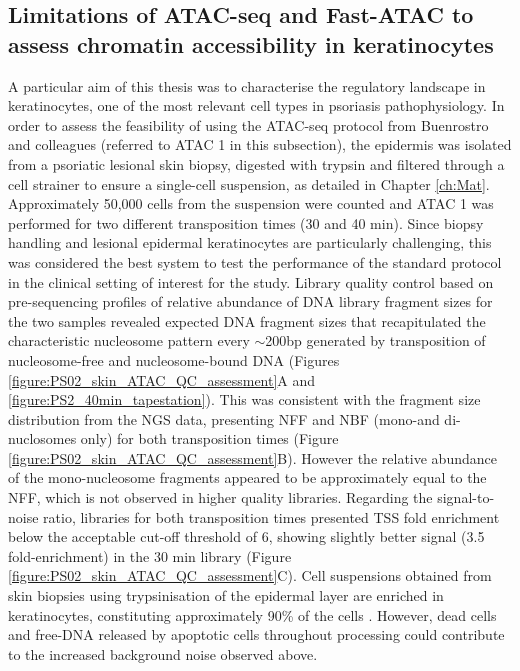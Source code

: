 \begin{figure}[htbp]
\label{figure:ATAC_vs_FAST_ATAC}
\end{figure} 



\subsection{Limitations of ATAC-seq and Fast-ATAC to assess chromatin accessibility in keratinocytes}
A particular aim of this thesis was to characterise the regulatory landscape in keratinocytes, one of the most relevant cell types in psoriasis pathophysiology. In order to assess the feasibility of using the ATAC-seq protocol from Buenrostro and colleagues \parencite{Buenrostro2013} (referred to ATAC 1 in this subsection), the epidermis was isolated from a psoriatic lesional skin biopsy, digested with trypsin and filtered through a cell strainer to ensure a single-cell suspension, as detailed in Chapter \ref{ch:Mat}. Approximately 50,000 cells from the suspension were counted and ATAC 1 was performed for two different transposition times (30 and 40 min). Since biopsy handling and lesional epidermal keratinocytes are particularly challenging, this was considered the best system to test the performance of the standard protocol in the clinical setting of interest for the study. Library quality control based on pre-sequencing profiles of relative abundance of DNA library fragment sizes for the two samples revealed expected DNA fragment sizes that recapitulated the characteristic nucleosome pattern every $\sim$200bp generated by transposition of nucleosome-free and nucleosome-bound DNA (Figures \ref{figure:PS02_skin_ATAC_QC_assessment}A and \ref{figure:PS2_40min_tapestation}). This was consistent with the fragment size distribution from the NGS data, presenting NFF and NBF (mono-and di-nuclosomes only) for both transposition times (Figure \ref{figure:PS02_skin_ATAC_QC_assessment}B). However the relative abundance of the mono-nucleosome fragments appeared to be approximately equal to the NFF, which is not observed in higher quality libraries. Regarding the signal-to-noise ratio, libraries for both transposition times presented TSS fold enrichment below the acceptable cut-off threshold of 6, showing slightly better signal (3.5 fold-enrichment) in the 30 min library (Figure \ref{figure:PS02_skin_ATAC_QC_assessment}C). Cell suspensions obtained from skin biopsies using trypsinisation of the epidermal layer are enriched in keratinocytes, constituting approximately 90\% of the cells \parencite{Haftek1986}. However, dead cells and free-DNA released by apoptotic cells throughout processing could contribute to the increased background noise observed above. 



